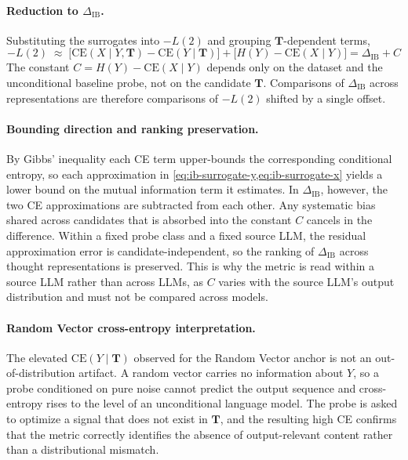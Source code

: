 \paragraph{Reduction to $\Delta_{\text{IB}}$.} Substituting the surrogates into $-L(2)$ and grouping $\mathbf{T}$-dependent terms,
\begin{equation}\label{eq:ib-reduction}
    -L(2) \;\approx\; \big[\text{CE}(X \mid Y, \mathbf{T}) - \text{CE}(Y \mid \mathbf{T})\big] + \big[H(Y) - \text{CE}(X \mid Y)\big] = \Delta_{\text{IB}} + C
\end{equation}
The constant $C = H(Y) - \text{CE}(X \mid Y)$ depends only on the dataset and the unconditional baseline probe, not on the candidate $\mathbf{T}$. Comparisons of $\Delta_{\text{IB}}$ across representations are therefore comparisons of $-L(2)$ shifted by a single offset.

\paragraph{Bounding direction and ranking preservation.} By Gibbs' inequality each CE term upper-bounds the corresponding conditional entropy, so each approximation in \cref{eq:ib-surrogate-y,eq:ib-surrogate-x} yields a lower bound on the mutual information term it estimates. In $\Delta_{\text{IB}}$, however, the two CE approximations are subtracted from each other. Any systematic bias shared across candidates that is absorbed into the constant $C$ cancels in the difference. Within a fixed probe class and a fixed source LLM, the residual approximation error is candidate-independent, so the ranking of $\Delta_{\text{IB}}$ across thought representations is preserved. This is why the metric is read within a source LLM rather than across LLMs, as $C$ varies with the source LLM's output distribution and must not be compared across models.

\paragraph{Random Vector cross-entropy interpretation.} The elevated $\text{CE}(Y \mid \mathbf{T})$ observed for the Random Vector anchor is not an out-of-distribution artifact. A random vector carries no information about $Y$, so a probe conditioned on pure noise cannot predict the output sequence and cross-entropy rises to the level of an unconditional language model. The probe is asked to optimize a signal that does not exist in $\mathbf{T}$, and the resulting high CE confirms that the metric correctly identifies the absence of output-relevant content rather than a distributional mismatch.

